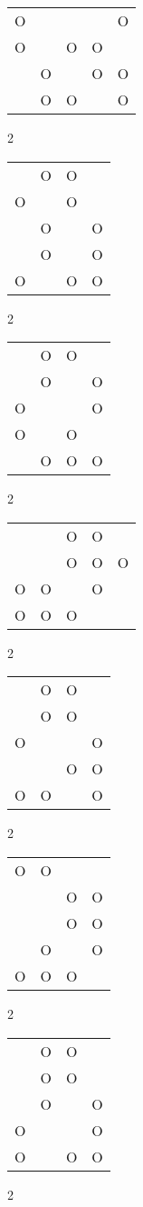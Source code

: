 \begin{tabular}{|m{0.2cm}m{0.2cm}m{0.2cm}m{0.2cm}m{0.2cm}|}\hline
O& & & &O\\
O& &O&O& \\
 &O& &O&O\\
 &O&O& &O\\
\hline\end{tabular}2
\begin{tabular}{|m{0.2cm}m{0.2cm}m{0.2cm}m{0.2cm}|}\hline
 &O&O& \\
O& &O& \\
 &O& &O\\
 &O& &O\\
O& &O&O\\
\hline\end{tabular}2
\begin{tabular}{|m{0.2cm}m{0.2cm}m{0.2cm}m{0.2cm}|}\hline
 &O&O& \\
 &O& &O\\
O& & &O\\
O& &O& \\
 &O&O&O\\
\hline\end{tabular}2
\begin{tabular}{|m{0.2cm}m{0.2cm}m{0.2cm}m{0.2cm}m{0.2cm}|}\hline
 & &O&O& \\
 & &O&O&O\\
O&O& &O& \\
O&O&O& & \\
\hline\end{tabular}2
\begin{tabular}{|m{0.2cm}m{0.2cm}m{0.2cm}m{0.2cm}|}\hline
 &O&O& \\
 &O&O& \\
O& & &O\\
 & &O&O\\
O&O& &O\\
\hline\end{tabular}2
\begin{tabular}{|m{0.2cm}m{0.2cm}m{0.2cm}m{0.2cm}|}\hline
O&O& & \\
 & &O&O\\
 & &O&O\\
 &O& &O\\
O&O&O& \\
\hline\end{tabular}2
\begin{tabular}{|m{0.2cm}m{0.2cm}m{0.2cm}m{0.2cm}|}\hline
 &O&O& \\
 &O&O& \\
 &O& &O\\
O& & &O\\
O& &O&O\\
\hline\end{tabular}2
